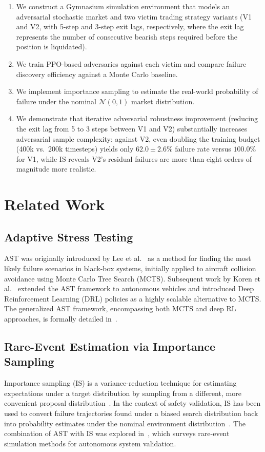 \documentclass[conference]{IEEEtran}
\begin{document}
\begin{enumerate}
  \item We construct a Gymnasium simulation environment that models an
    adversarial stochastic market and two victim trading strategy variants
    (V1 and V2, with 5-step and 3-step exit lags, respectively, where the exit lag represents the number of consecutive bearish steps required before the position is liquidated).
  \item We train PPO-based adversaries against each victim and compare
    failure discovery efficiency against a Monte Carlo baseline.
  \item We implement importance sampling to estimate the real-world probability
    of failure under the nominal $\mathcal{N}(0,1)$ market distribution.
  \item We demonstrate that iterative adversarial robustness improvement (reducing
    the exit lag from 5 to 3 steps between V1 and V2) substantially increases adversarial
    sample complexity: against V2, even doubling the training budget (400k vs.\ 200k timesteps)
    yields only $62.0 \pm 2.6\%$ failure rate versus $100.0\%$ for V1, while IS
    reveals V2's residual failures are more than eight orders of magnitude
    more realistic.
\end{enumerate}

\section{Related Work}

\subsection{Adaptive Stress Testing}
AST was originally introduced by Lee et al.~\cite{lee2015adaptive} as a
method for finding the most likely failure scenarios in black-box systems,
initially applied to aircraft collision avoidance using Monte Carlo Tree
Search (MCTS). Subsequent work by Koren et al.~\cite{koren2018adaptive}
extended the AST framework to autonomous vehicles and introduced Deep
Reinforcement Learning (DRL) policies as a highly scalable alternative to
MCTS. The generalized AST framework, encompassing both MCTS and deep RL
approaches, is formally detailed in~\cite{lee2020adaptive}.

\subsection{Rare-Event Estimation via Importance Sampling}
Importance sampling (IS) is a variance-reduction technique for
estimating expectations under a target distribution by sampling from a
different, more convenient proposal distribution~\cite{tokdar2010is}.
In the context of safety validation, IS has been used to convert failure
trajectories found under a biased search distribution back into
probability estimates under the nominal environment
distribution~\cite{zhao2016accelerated}. The combination of AST with IS
was explored in~\cite{corso2021survey}, which surveys rare-event simulation
methods for autonomous system validation.
\end{document}
